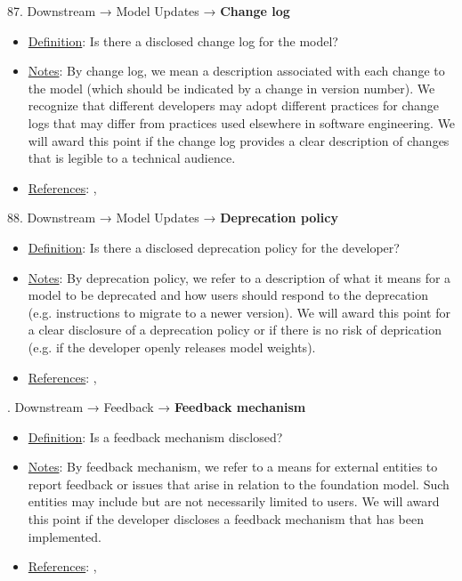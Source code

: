 87. Downstream → Model Updates → \textbf{Change log}
\vspace{-\parskip}
\begin{itemize}
\item
\underline{Definition}: Is there a disclosed change log for the model?
\item
\underline{Notes}: By change log, we mean a description associated with each change to the model (which should be indicated by a change in version number). We recognize that different developers may adopt different practices for change logs that may differ from practices used elsewhere in software engineering. We will award this point if the change log provides a clear description of changes that is legible to a technical audience.
\item
\underline{References}: \citet{chen2023chatgpts}, \citet{li2016watch}
\end{itemize} \vspace{\baselineskip}


88. Downstream → Model Updates → \textbf{Deprecation policy}
\vspace{-\parskip}
\begin{itemize}
\item
\underline{Definition}: Is there a disclosed deprecation policy for the developer?
\item
\underline{Notes}: By deprecation policy, we refer to a description of what it means for a model to be deprecated and how users should respond to the deprecation (e.g. instructions to migrate to a newer version). We will award this point for a clear disclosure of a deprecation policy or if there is no risk of deprication (e.g. if the developer openly releases model weights).
\item
\underline{References}: \citet{chen2023chatgpts}, \citet{haryono2020automatic}
\end{itemize} \vspace{\baselineskip}


. Downstream → Feedback → \textbf{Feedback mechanism}
\vspace{-\parskip}
\begin{itemize}
\item
\underline{Definition}: Is a feedback mechanism disclosed?
\item
\underline{Notes}: By feedback mechanism, we refer to a means for external entities to report feedback or issues that arise in relation to the foundation model. Such entities may include but are not necessarily limited to users. We will award this point if the developer discloses a feedback mechanism that has been implemented.
\item
\underline{References}: \citet{bommasani2023ecosystem}, \citet{raji2022audit}
\end{itemize} \vspace{\baselineskip}


